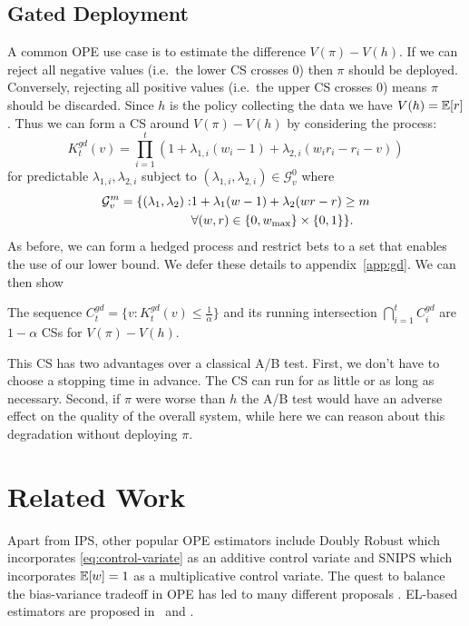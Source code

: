 \subsection{Gated Deployment}
A common OPE use case is to estimate the difference $V(\pi) - V(h)$. If we
can reject all negative values (i.e.\ the lower CS crosses 0) then $\pi$ should be deployed. Conversely,
rejecting all positive values (i.e.\ the upper CS crosses 0) means $\pi$ should be discarded. Since $h$ is the policy collecting the data we have $V(h)=\mathbb{E}[r]$. Thus we can form a CS 
around $V(\pi) - V(h)$ by considering the process:
\[
K_t^{gd}(v) = \prod_{i=1}^t \left(1+\lambda_{1,i} (w_i-1) + \lambda_{2,i}(w_ir_i -r_i -v)\right)  
\]
for predictable $\lambda_{1,i},\lambda_{2,i}$ subject to $(\lambda_{1,i},\lambda_{2,i}) \in \mathcal{G}_{v}^0$
where
\begin{align}
\mathcal{G}_{v}^m = \{(\lambda_{1},\lambda_{2}): & 1+\lambda_1(w-1)+\lambda_2(wr-r)\geq m \notag\\
                         & \forall (w,r) \in \{0,w_{\max}\}\times \{0,1\}
\}.
\end{align}
As before, we can form a hedged process and restrict bets to a set that
enables the use of our lower bound. We defer these details to 
appendix~\ref{app:gd}. We can then show
\begin{theorem}
\label{thm:gated}
The sequence $C_t^{gd} = \{v:K_t^{gd}(v)\leq \frac{1}{\alpha}\}$ and its 
running intersection $\bigcap_{i=1}^t C_i^{gd}$
are $1-\alpha$ CSs for $V(\pi)-V(h)$.
\end{theorem}
This CS has two advantages 
over a classical A/B test. First, we don't have to 
choose a stopping time in advance. The CS can run for
as little or as long as necessary. Second, if $\pi$ were
worse than $h$ the A/B test would have an adverse effect
on the quality of the overall system, while here we can
reason about this degradation without deploying $\pi$.

\section{Related Work}
\label{sec:related}

Apart from IPS, other popular OPE estimators include Doubly Robust \cite{RnR,
dudik2011doubly} which incorporates \eqref{eq:control-variate} as an additive
control variate and SNIPS \cite{swaminathan2015self} which incorporates
$\mathbb{E}[w]=1$ as a multiplicative control variate.  The quest to balance the
bias-variance tradeoff in OPE has led to many different 
proposals \cite{SWITCH,vlassis2019design}.
EL-based estimators are proposed in~\cite{kallus2019intrinsically} and
\cite{karampatziakis2019empirical}.

